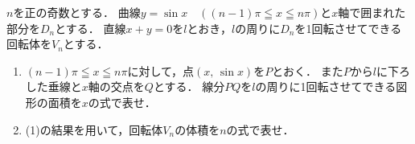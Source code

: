 \documentclass[../../main.tex]{subfiles}
\begin{document}
$n$を正の奇数とする．
曲線$y=\sin x$　$((n-1)\pi \leqq x \leqq n\pi)$と$x$軸で囲まれた部分を$D_n$とする．
直線$x+y=0$を$l$とおき，$l$の周りに$D_n$を1回転させてできる回転体を$V_n$とする．
\begin{enumerate}
  \item$(n-1)\pi \leqq x \leqq n\pi$に対して，点$(x, \, \sin x)$を$P$とおく．
    また$P$から$l$に下ろした垂線と$x$軸の交点を$Q$とする．
    線分$PQ$を$l$の周りに1回転させてできる図形の面積を$x$の式で表せ．
  \item(1)の結果を用いて，回転体$V_n$の体積を$n$の式で表せ．
\end{enumerate}
\end{document}
